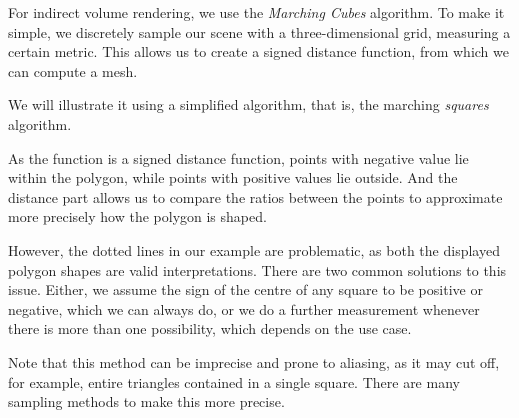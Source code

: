 \documentclass[english]{panikzettel}
\begin{document}
\begin{halfboxl}
For indirect volume rendering, we use the \emph{Marching Cubes} algorithm. To make it simple, we discretely sample our scene with a three-dimensional grid, measuring a certain metric. This allows us to create a signed distance function, from which we can compute a mesh.

We will illustrate it using a simplified algorithm, that is, the marching \emph{squares} algorithm.

As the function is a signed distance function, points with negative value lie within the polygon, while points with positive values lie outside. And the distance part allows us to compare the ratios between the points to approximate more precisely how the polygon is shaped.

However, the dotted lines in our example are problematic, as both the displayed polygon shapes are valid interpretations. There are two common solutions to this issue. Either, we assume the sign of the centre of any square to be positive or negative, which we can always do, or we do a further measurement whenever there is more than one possibility, which depends on the use case.

Note that this method can be imprecise and prone to aliasing, as it may cut off, for example, entire triangles contained in a single square. There are many sampling methods to make this more precise.
\end{halfboxl}%
\end{document}
